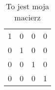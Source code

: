 \begin{table}[htbp]
\begin{tabular}{|llll|}
1 & 0 & 0 & 0   \\
0 & 1 & 0 & 0   \\
0 & 0 & 1 & 0   \\
0 & 0 & 0 & 1  
\end{tabular}
\label{tab:michalbros_tab}
\caption{To jest moja macierz}
\end{table}
